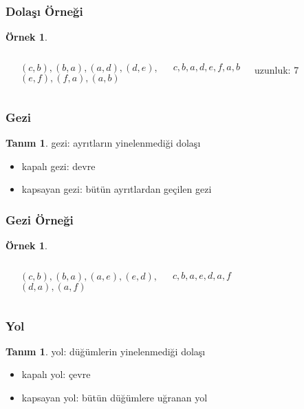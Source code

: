 \documentclass[dvipsnames]{beamer}
\theoremstyle{definition}
\newtheorem{tanim}[theorem]{Tanım}
\theoremstyle{example}
\newtheorem{ornek}[theorem]{Örnek}
\theoremstyle{plain}
\begin{document}
\begin{frame}
  \frametitle{Dolaşı Örneği}

  \begin{ornek}
    \begin{columns}
      \begin{center}
      \end{center}

      $(c,b),(b,a),(a,d),(d,e),$\\
      $(e,f),(f,a),(a,b)$

      \medskip
      $c,b,a,d,e,f,a,b$

      \bigskip
      uzunluk: 7
    \end{columns}
  \end{ornek}
\end{frame}

\begin{frame}
  \frametitle{Gezi}

  \begin{tanim}
    \alert{gezi}: ayrıtların yinelenmediği dolaşı

    \pause
    \begin{itemize}
      \item kapalı gezi: \alert{devre}
      \item \alert{kapsayan gezi}: bütün ayrıtlardan geçilen gezi
    \end{itemize}
  \end{tanim}
\end{frame}

\begin{frame}
  \frametitle{Gezi Örneği}

  \begin{ornek}
    \begin{columns}
      \begin{center}
      \end{center}

      $(c,b),(b,a),(a,e),(e,d),$\\
      $(d,a),(a,f)$

      \medskip
      $c,b,a,e,d,a,f$
    \end{columns}
  \end{ornek}
\end{frame}

\begin{frame}
  \frametitle{Yol}

  \begin{tanim}
    \alert{yol}: düğümlerin yinelenmediği dolaşı

    \pause
    \begin{itemize}
      \item kapalı yol: \alert{çevre}
      \item \alert{kapsayan yol}: bütün düğümlere uğranan yol
    \end{itemize}
  \end{tanim}
\end{frame}
\end{document}
